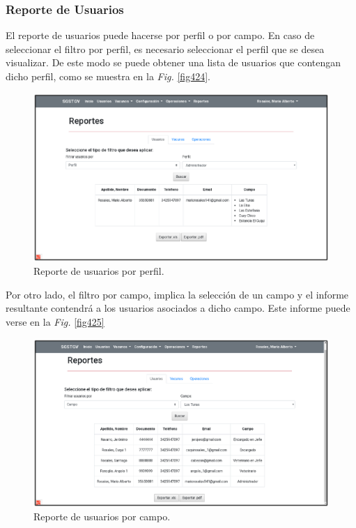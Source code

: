 \documentclass[11pt,oneside]{book}
\begin{document}
\newpage
\subsubsection{Reporte de Usuarios}
El reporte de usuarios puede hacerse por perfil o por campo. En caso de seleccionar el filtro por perfil, es necesario seleccionar el perfil que se desea visualizar. De este modo se puede obtener una lista de usuarios que contengan dicho perfil, como se muestra en la \textit{Fig.} \eqref{fig424}.
\begin{figure}[tbhp]
\centerline{\includegraphics[scale=0.87]{figs/capitulo_3_desarrollo/fig424.pdf}}
\caption{Reporte de usuarios por perfil.}
\label{fig424}
\end{figure}

Por otro lado, el filtro por campo, implica la selección de un campo y el informe resultante contendrá a los usuarios asociados a dicho campo. Este informe puede verse en la \textit{Fig.} \eqref{fig425}
\begin{figure}[tbhp]
\centerline{\includegraphics[scale=0.87]{figs/capitulo_3_desarrollo/fig425.pdf}}
\caption{Reporte de usuarios por campo.}
\label{fig425}
\end{figure}
\end{document}
